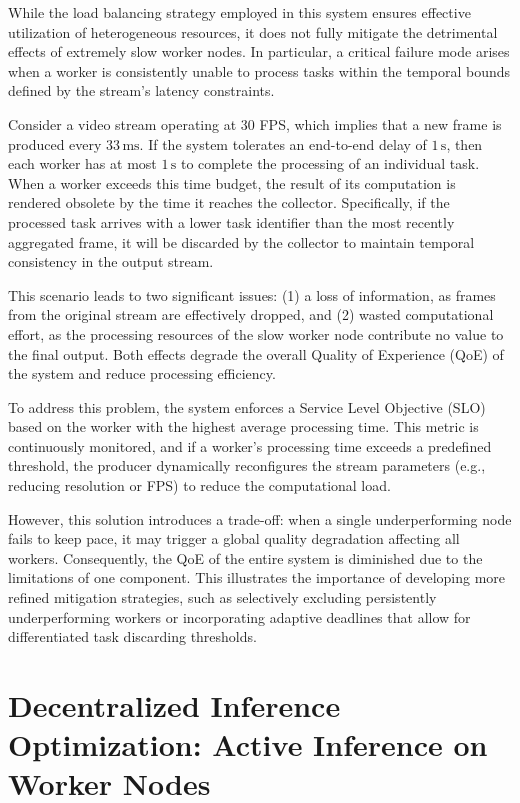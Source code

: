 While the load balancing strategy employed in this system ensures effective utilization of heterogeneous resources, it does not fully mitigate the detrimental effects of extremely slow worker nodes. In particular, a critical failure mode arises when a worker is consistently unable to process tasks within the temporal bounds defined by the stream's latency constraints.

Consider a video stream operating at 30 FPS, which implies that a new frame is produced every \(33\,\text{ms}\). If the system tolerates an end-to-end delay of \(1\,\text{s}\), then each worker has at most \(1\,\text{s}\) to complete the processing of an individual task. When a worker exceeds this time budget, the result of its computation is rendered obsolete by the time it reaches the collector. Specifically, if the processed task arrives with a lower task identifier than the most recently aggregated frame, it will be discarded by the collector to maintain temporal consistency in the output stream.

This scenario leads to two significant issues: (1) a loss of information, as frames from the original stream are effectively dropped, and (2) wasted computational effort, as the processing resources of the slow worker node contribute no value to the final output. Both effects degrade the overall Quality of Experience (QoE) of the system and reduce processing efficiency.

To address this problem, the system enforces a Service Level Objective (SLO) based on the worker with the highest average processing time. This metric is continuously monitored, and if a worker's processing time exceeds a predefined threshold, the producer dynamically reconfigures the stream parameters (e.g., reducing resolution or FPS) to reduce the computational load. 

However, this solution introduces a trade-off: when a single underperforming node fails to keep pace, it may trigger a global quality degradation affecting all workers. Consequently, the QoE of the entire system is diminished due to the limitations of one component. This illustrates the importance of developing more refined mitigation strategies, such as selectively excluding persistently underperforming workers or incorporating adaptive deadlines that allow for differentiated task discarding thresholds.

\section{Decentralized Inference Optimization: Active Inference on Worker Nodes}

